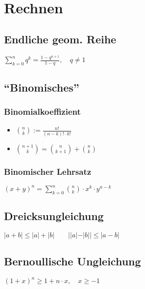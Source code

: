 \section*{Rechnen}

\subsection*{Endliche geom. Reihe}
$\displaystyle \sum_{k=0}^n q^k = \frac{1-q^{n+1}}{1-q}, \quad q \neq 1$

\subsection*{\enquote{Binomisches}}

\subsubsection*{Binomialkoeffizient}
\begin{itemize}
	\item $\binom{n}{k} := \frac{n!}{(n-k)!\cdot k!}$
	\item $\binom{n+1}{k}=\binom{n}{k+1}+\binom{n}{k}$
\end{itemize}

\subsubsection*{Binomischer Lehrsatz}
$\displaystyle (x+y)^n = \sum_{k=0}^n \binom{n}{k}\cdot x^k \cdot y^{n-k}$

\subsection*{Dreicksungleichung}
$|a+b|\le|a| + |b| \qquad ||a|-|b|| \le |a - b|$

\subsection*{Bernoullische Ungleichung}
$(1+x)^n \ge 1 + n \cdot x, \quad x \ge -1$
